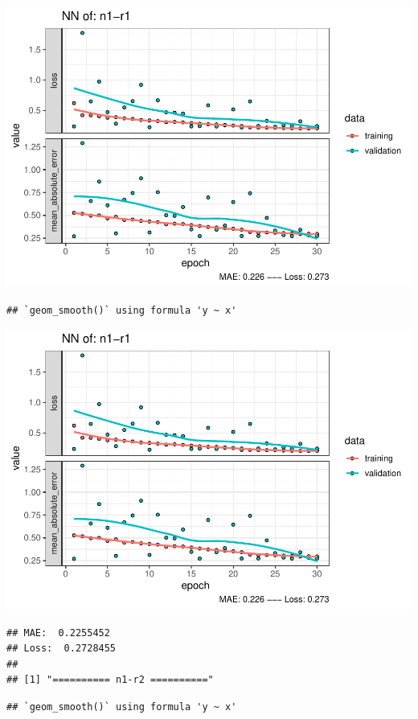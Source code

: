 \documentclass[
]{article}
\begin{document}
\includegraphics{project-code_files/figure-latex/unnamed-chunk-18-11.pdf}

\begin{verbatim}
## `geom_smooth()` using formula 'y ~ x'
\end{verbatim}

\includegraphics{project-code_files/figure-latex/unnamed-chunk-18-12.pdf}

\begin{verbatim}
## MAE:  0.2255452
## Loss:  0.2728455 
## 
## [1] "========== n1-r2 =========="
\end{verbatim}

\begin{verbatim}
## `geom_smooth()` using formula 'y ~ x'
\end{verbatim}
\end{document}
